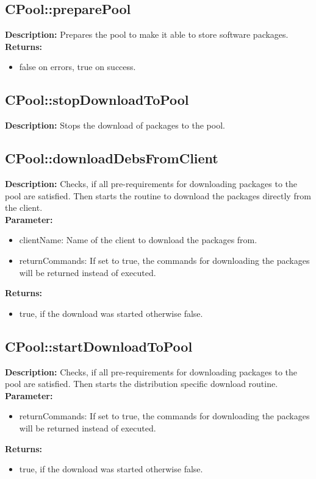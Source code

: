 \subsection{CPool::preparePool}
\textbf{Description:} Prepares the pool to make it able to store software packages.\\
\textbf{Returns:}
\begin{itemize}
\item false on errors, true on success.
\end{itemize}

\subsection{CPool::stopDownloadToPool}
\textbf{Description:} Stops the download of packages to the pool.\\

\subsection{CPool::downloadDebsFromClient}
\textbf{Description:} Checks, if all pre-requirements for downloading packages to the pool are satisfied. Then starts the routine to download the packages directly from the client.\\
\textbf{Parameter:}
\begin{itemize}
\item clientName: Name of the client to download the packages from.
\item returnCommands: If set to true, the commands for downloading the packages will be returned instead of executed.
\end{itemize}
\textbf{Returns:}
\begin{itemize}
\item true, if the download was started otherwise false.
\end{itemize}

\subsection{CPool::startDownloadToPool}
\textbf{Description:} Checks, if all pre-requirements for downloading packages to the pool are satisfied. Then starts the distribution specific download routine.\\
\textbf{Parameter:}
\begin{itemize}
\item returnCommands: If set to true, the commands for downloading the packages will be returned instead of executed.
\end{itemize}
\textbf{Returns:}
\begin{itemize}
\item true, if the download was started otherwise false.
\end{itemize}

